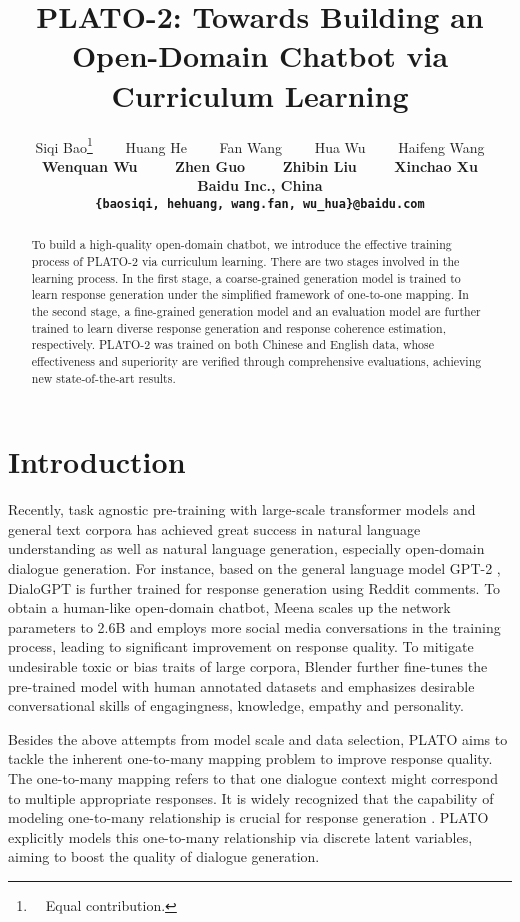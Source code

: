 \documentclass[11pt,a4paper]{article}
\title{PLATO-2: Towards Building an Open-Domain Chatbot via\\ Curriculum Learning}
\author{Siqi Bao\thanks{~~Equal contribution.}~~~~ Huang He\footnotemark[1]~~~~ Fan Wang\footnotemark[1]~~~~ Hua Wu\footnotemark[1]~~~~ Haifeng Wang\\
	\bf{Wenquan Wu~~~~ Zhen Guo~~~~ Zhibin Liu~~~~ Xinchao Xu}\\
	Baidu Inc., China \\
	\texttt{\{baosiqi, hehuang, wang.fan, wu\_hua\}@baidu.com}}
\date{}
\begin{document}
	\maketitle
	\begin{abstract}
		To build a high-quality open-domain chatbot, we introduce the effective training process of PLATO-2 via curriculum learning. There are two stages involved in the learning process. In the first stage, a coarse-grained generation model is trained to learn response generation under the simplified framework of one-to-one mapping. In the second stage, a fine-grained generation model and an evaluation model are further trained to learn diverse response generation and response coherence estimation, respectively. PLATO-2 was trained on both Chinese and English data, whose effectiveness and superiority are verified through comprehensive evaluations, achieving new state-of-the-art results.
	\end{abstract}
	
	\section{Introduction}
	Recently, task agnostic pre-training with large-scale transformer models \cite{vaswani2017attention} and general text corpora has achieved great success in natural language understanding \cite{devlin2019bert} as well as natural language generation, especially open-domain dialogue generation. For instance, based on the general language model GPT-2 \cite{radford2019language}, DialoGPT \cite{zhang2019dialogpt} is further trained for response generation using Reddit comments. To obtain a human-like open-domain chatbot, Meena \cite{adiwardana2020towards} scales up the network parameters to 2.6B and employs more social media conversations in the training process, leading to significant improvement on response quality. To mitigate undesirable toxic or bias traits of large corpora, Blender \cite{roller2020recipes} further fine-tunes the pre-trained model with human annotated datasets and emphasizes desirable conversational skills of engagingness, knowledge, empathy and personality. 
	
	Besides the above attempts from model scale and data selection, PLATO \cite{bao2019plato} aims to tackle the inherent one-to-many mapping problem to improve response quality. The one-to-many mapping refers to that one dialogue context might correspond to multiple appropriate responses. It is widely recognized that the capability of modeling one-to-many relationship is crucial for response generation \cite{zhao2017learning, chen2019generating}. PLATO explicitly models this one-to-many relationship via discrete latent variables, aiming to boost the quality of dialogue generation.
	
\end{document}
